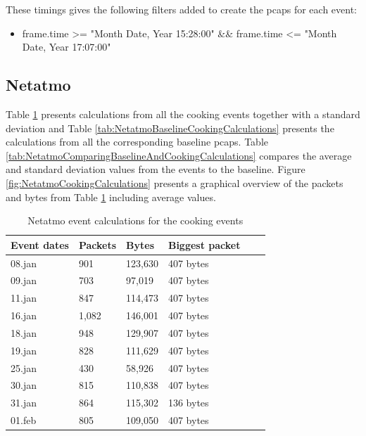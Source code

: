 These timings gives the following filters added to create the pcaps for each event:

\begin{itemize}
    \item frame.time >= "Month Date, Year 15:28:00" \&\& frame.time <= "Month Date, Year 17:07:00"
\end{itemize}

\newpage
\subsection{Netatmo}
Table \ref{tab:NetatmoCookingCalculations} presents calculations from all the cooking events together with a standard deviation and Table \ref{tab:NetatmoBaselineCookingCalculations} presents the calculations from all the corresponding baseline pcaps. Table \ref{tab:NetatmoComparingBaselineAndCookingCalculations} compares the average and standard deviation values from the events to the baseline. Figure \ref{fig:NetatmoCookingCalculations} presents a graphical overview of the packets and bytes from Table \ref{tab:NetatmoCookingCalculations} including average values.

\begin{table}[H]
    \centering
    \caption{Netatmo event calculations for the cooking events}
    \begin{tabular}{|l|l|l|l|l|l|}
    \hline
        \textbf{Event dates} & \textbf{Packets} & \textbf{Bytes} & \textbf{Biggest packet} \\ \hline
        08.jan & 901 & 123,630 & 407 bytes\\ \hline
        09.jan & 703 & 97,019 & 407 bytes \\ \hline
        11.jan & 847 & 114,473 & 407 bytes\\ \hline
        16.jan & 1,082 & 146,001 & 407 bytes\\ \hline
        18.jan & 948 & 129,907 & 407 bytes\\ \hline
        19.jan & 828 & 111,629 & 407 bytes \\ \hline
        25.jan & 430 & 58,926 & 407 bytes \\ \hline
        30.jan & 815 & 110,838 & 407 bytes \\ \hline
        31.jan & 864 & 115,302 & 136 bytes \\ \hline
        01.feb & 805 & 109,050 & 407 bytes \\ \hline
    \end{tabular}
    \label{tab:NetatmoCookingCalculations}
\end{table}

